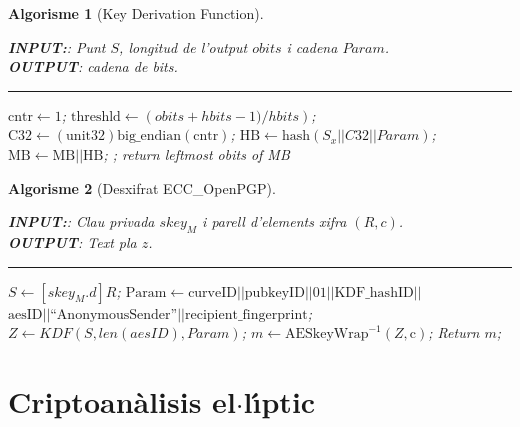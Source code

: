 \documentclass{beamer}
\theoremstyle{saltolinea}   			%
\newtheorem{algo}{Algorisme}
\begin{document}
\begin{frame}
  \begin{algo}[Key Derivation Function]\label{alg:KDF}
    \parbox[b]{\linewidth}{%
      {\bf INPUT:}: Punt $S$, longitud de l'output $obits$ i cadena $Param$.\\
      {\bf OUTPUT}: cadena de bits.
      \hrule
    }%
    \vspace{-7mm}
    \begin{algorithmic}[1]
      \STATE $\textrm{cntr}  \leftarrow  1$;
      \STATE $\textrm{threshld}  \leftarrow \left(obits+hbits-1)/hbits\right)$;
      \REPEAT
      \STATE $\textrm{C32} \leftarrow \left(\textrm{unit32}\right)\textrm{big\_endian}\left(\textrm{cntr}\right)$;
      \STATE $\textrm{HB} \leftarrow \textrm{hash}\left(S_{x} || C32 || Param\right)$;
      \STATE $\textrm{MB} \leftarrow \textrm{MB} || \textrm{HB}$;
      ;
      \STATE return leftmost obits of MB
    \end{algorithmic}
  \end{algo}
\end{frame}

\begin{frame}
  \begin{algo}[Desxifrat ECC\_OpenPGP]\label{alg:deseccOpenPGP}
    \parbox[b]{\linewidth}{%
      {\bf INPUT:}: Clau privada $skey_{M}$ i parell d'elements xifra $\left(R,c\right)$.\\
      {\bf OUTPUT}: Text pla $z$.
      \hrule
    }%
    \vspace{-7mm}
    \begin{algorithmic}[1]
      \STATE $S \leftarrow \left[skey_{M}.d\right] R$;
      \STATE $\textrm{Param}  \leftarrow \textrm{curveID} || \textrm{pubkeyID} || 01 || \textrm{KDF\_hashID} || $\\$ \textrm{aesID} || \textrm{``AnonymousSender''} || \textrm{recipient\_fingerprint}$;
      \STATE $Z \leftarrow KDF\left(S,len\left(aesID\right),Param\right)$;\label{alg:deseccOpenPGP:kdf}
      \STATE $m \leftarrow \textrm{AESkeyWrap}^{-1}\left(Z,\textrm{c}\right)$;
      \STATE Return $m$;
    \end{algorithmic}
  \end{algo}
\end{frame}

\section{Criptoan\`alisis el$\cdot$l\'{\i}ptic}
\end{document}
